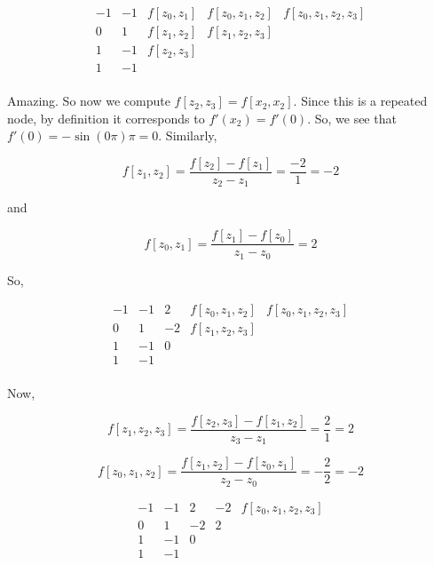 \documentclass[12pt]{article}
\theoremstyle{definition}
\begin{document}
\begin{equation*}
    \begin{array}{c|c|c|c|c}
-1 & -1 & f[z_0,z_1] & f[z_0,z_1,z_2]&f[z_0,z_1,z_2,z_3]  \\
0 & 1 & f[z_1,z_2] & f[z_1,z_2,z_3]  \\
1 & -1 & f[z_2,z_3]   \\
1 & -1 & & & \\
\end{array}
\end{equation*}

Amazing. So now we compute $f[z_2, z_3] = f[x_2, x_2]$. Since this is a repeated
node, by definition it corresponds to $f'(x_2) = f'(0)$. So, we see that 
$f'\left( 0 \right) = - \sin(0\pi) \pi = 0$. Similarly, 

\begin{equation*}
    f[z_1, z_2] = \frac{f[z_2] - f[z_1]}{z_2 - z_1} = \frac{-2}{1} = -2
\end{equation*}

and 

\begin{equation*}
    f[z_0, z_1] = \frac{f[z_1] - f[z_0]}{z_1 - z_0} = 2
\end{equation*}

So,

\begin{equation*}
    \begin{array}{c|c|c|c|c}
-1 & -1 & 2 & f[z_0,z_1,z_2]&f[z_0,z_1,z_2,z_3]  \\
0 & 1 & -2 & f[z_1,z_2,z_3]  \\
1 & -1 & 0   \\
1 & -1 & & & \\
\end{array}
\end{equation*}

Now, 

\begin{equation*}
    f[z_1, z_2, z_3] = \frac{ f[z_2, z_3] - f[z_1, z_2] }{z_3 - z_1} =
    \frac{2}{1} = 2
\end{equation*}

\begin{equation*}
    f[z_0, z_1, z_2] = \frac{ f[z_1, z_2] - f[z_0, z_1] }{z_2 - z_0} =
    -\frac{2}{2} = -2
\end{equation*}

\begin{equation*}
    \begin{array}{c|c|c|c|c}
-1 & -1 & 2 & -2&f[z_0,z_1,z_2,z_3]  \\
0 & 1 & -2 & 2  \\
1 & -1 & 0   \\
1 & -1 & & & \\
\end{array}
\end{equation*}
\end{document}
